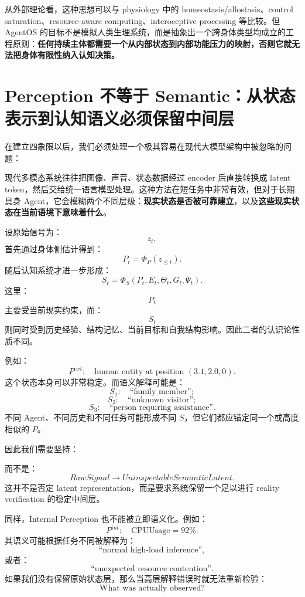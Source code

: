 从外部理论看，这种思想可以与 physiology 中的 homeostasis/allostasis、control saturation、resource-aware computing、interoceptive processing 等比较。但 AgentOS 的目标不是模拟人类生理系统，而是抽象出一个跨身体类型均成立的工程原则：\textbf{任何持续主体都需要一个从内部状态到内部功能压力的映射，否则它就无法把身体有限性纳入认知决策。}

\section{Perception 不等于 Semantic：从状态表示到认知语义必须保留中间层}
\label{sec:perception-not-semantic}

在建立四象限以后，我们必须处理一个极其容易在现代大模型架构中被忽略的问题：
\begin{statementbox}
\centering
{}
\end{statementbox}
现代多模态系统往往把图像、声音、状态数据经过 encoder 后直接转换成 latent token，然后交给统一语言模型处理。这种方法在短任务中非常有效，但对于长期具身 Agent，它会模糊两个不同层级：\textbf{现实状态是否被可靠建立}，以及\textbf{这些现实状态在当前语境下意味着什么}。

设原始信号为：
\[
z_t,
\]
首先通过身体侧估计得到：
\[
P_t
=
\Phi_P(z_{\leq t}).
\]
随后认知系统才进一步形成：
\[
S_t
=
\Phi_S(
P_t,
E_t,
\Theta_t,
G_t,
\Psi_t
).
\]
这里：
\[
P_t
\]
主要受当前现实约束，而：
\[
S_t
\]
则同时受到历史经验、结构记忆、当前目标和自我结构影响。因此二者的认识论性质不同。

例如：
\[
P^{ext}:
\quad
\text{human entity at position }(3.1,2.0,0).
\]
这个状态本身可以非常稳定。而语义解释可能是：
\[
S_1:
\quad
\text{``family member''};
\]
\[
S_2:
\quad
\text{``unknown visitor''};
\]
\[
S_3:
\quad
\text{``person requiring assistance''}.
\]
不同 Agent、不同历史和不同任务可能形成不同 $S$，但它们都应锚定同一个或高度相似的 $P$。

因此我们需要坚持：
\begin{statementbox}
\centering
{}
\end{statementbox}
而不是：
\[
RawSignal
\rightarrow
UninspectableSemanticLatent.
\]
这并不是否定 latent representation，而是要求系统保留一个足以进行 reality verification 的稳定中间层。

同样，Internal Perception 也不能被立即语义化。例如：
\[
P^{int}:
\quad
\mathrm{CPUUsage}=92\%.
\]
其语义可能根据任务不同被解释为：
\[
\text{``normal high-load inference''},
\]
或者：
\[
\text{``unexpected resource contention''}.
\]
如果我们没有保留原始状态层，那么当高层解释错误时就无法重新检验：
\[
\text{What was actually observed?}
\]

